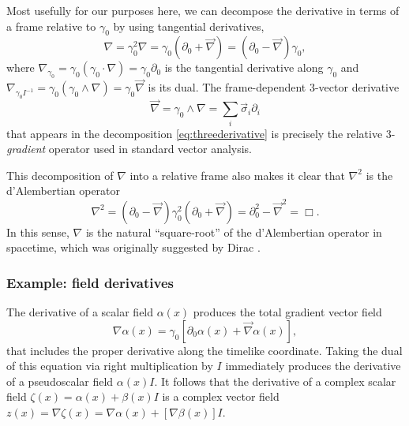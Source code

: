 \documentclass[1p,sort&compress]{elsarticle}
\numberwithin{equation}{section}
\newcommand{\rv}[1]{\vec{#1}}
\begin{document}
Most usefully for our purposes here, we can decompose the derivative in terms of a frame relative to $\gamma_0$ by using tangential derivatives, 
\begin{equation}\label{eq:threederivative}
  \nabla = \gamma_0^2 \nabla = \gamma_0(\partial_0 + \rv{\nabla}) = (\partial_0 - \rv{\nabla})\gamma_0,
\end{equation}
where $\nabla_{\gamma_0} = \gamma_0(\gamma_0\cdot\nabla) = \gamma_0\partial_0$ is the tangential derivative along $\gamma_0$ and $\nabla_{\gamma_0 I^{-1}} = \gamma_0(\gamma_0 \wedge \nabla) = \gamma_0 \rv{\nabla}$ is its dual.  The frame-dependent 3-vector derivative 
\begin{equation}\label{eq:threegradient}
  \rv{\nabla} = \gamma_0 \wedge \nabla = \sum_i \rv{\sigma}_i \partial_i
\end{equation}
that appears in the decomposition \eqref{eq:threederivative} is precisely the relative 3-\emph{gradient} operator used in standard vector analysis.  

This decomposition of $\nabla$ into a relative frame also makes it clear that $\nabla^2$ is the d'Alembertian operator
\begin{equation}
  \nabla^2 = (\partial_0 - \rv{\nabla})\gamma_0^2(\partial_0 + \rv{\nabla}) = \partial_0^2 - \rv{\nabla}^2 = \Box.
\end{equation}
In this sense, $\nabla$ is the natural ``square-root'' of the d'Alembertian operator in spacetime, which was originally suggested by Dirac \cite{Dirac1928}.


\subsubsection{Example: field derivatives}


The derivative of a scalar field $\alpha(x)$ produces the total gradient vector field 
\begin{equation}\label{eq:scalarfield}
  \nabla\alpha(x) = \gamma_0[\partial_0\alpha(x) + \rv{\nabla}\alpha(x)],
\end{equation}
that includes the proper derivative along the timelike coordinate.  Taking the dual of this equation via right multiplication by $I$ immediately produces the derivative of a pseudoscalar field $\alpha(x)I$.  It follows that the derivative of a complex scalar field $\zeta(x) = \alpha(x) + \beta(x)I$ is a complex vector field $z(x) = \nabla\zeta(x) = \nabla\alpha(x) + [\nabla\beta(x)]I$.
\end{document}
